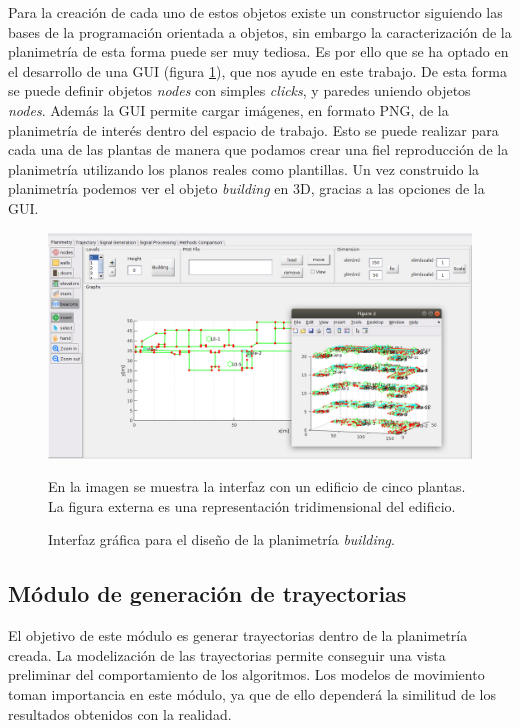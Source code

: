 Para la creación de cada uno de estos objetos existe un constructor siguiendo las bases de la programación orientada a objetos, sin embargo la caracterización de la planimetría de esta forma puede ser muy tediosa. Es por ello que se ha optado en el desarrollo de una GUI (figura \ref{fig:interfaz1}), que nos ayude en este trabajo. De esta forma se puede definir objetos \emph{nodes} con simples \emph{clicks}, y paredes uniendo objetos \emph{nodes}. Además la GUI permite cargar imágenes, en formato PNG, de la planimetría de interés dentro del espacio de trabajo. Esto se puede realizar para cada una de las plantas de manera que podamos crear una fiel reproducción de la planimetría utilizando los planos reales como plantillas. Un vez construido la planimetría podemos ver el objeto \emph{building} en 3D, gracias a las opciones de la GUI.


\begin{figure}
    \centering
    \includegraphics[width=1.00\columnwidth]{img/Design/1.PNG}
    \caption{Interfaz gráfica para el diseño de la planimetría \emph{building}.}
    \small
    En la imagen se muestra la interfaz con un edificio de cinco plantas. La figura externa es una representación tridimensional del edificio.
    \label{fig:interfaz1}
\end{figure}



\subsection{Módulo de generación de trayectorias}

El objetivo de este módulo es generar trayectorias dentro de la planimetría creada. La modelización de las trayectorias permite conseguir una vista preliminar del comportamiento de los algoritmos. Los modelos de movimiento toman importancia en este módulo, ya que de ello dependerá la similitud de los resultados obtenidos con la realidad.

